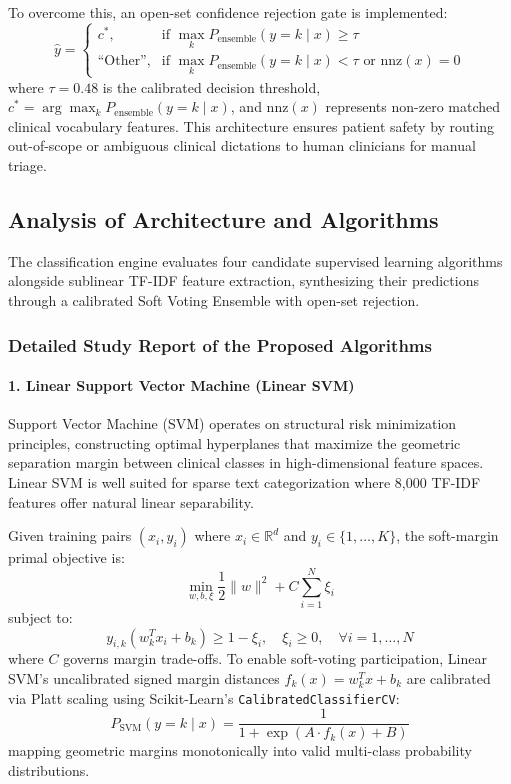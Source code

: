 To overcome this, an open-set confidence rejection gate is implemented:
\begin{equation}
\hat{y} = 
\begin{cases} 
c^*, & \text{if } \max_{k} P_{\text{ensemble}}(y = k \mid x) \ge \tau \\
\text{``Other''}, & \text{if } \max_{k} P_{\text{ensemble}}(y = k \mid x) < \tau \text{ or } \text{nnz}(x) = 0
\end{cases}
\end{equation}
where $\tau = 0.48$ is the calibrated decision threshold, $c^* = \arg\max_k P_{\text{ensemble}}(y = k \mid x)$, and $\text{nnz}(x)$ represents non-zero matched clinical vocabulary features. This architecture ensures patient safety by routing out-of-scope or ambiguous clinical dictations to human clinicians for manual triage.

\subsection{Analysis of Architecture and Algorithms}

The classification engine evaluates four candidate supervised learning algorithms alongside sublinear TF-IDF feature extraction, synthesizing their predictions through a calibrated Soft Voting Ensemble with open-set rejection.

\subsubsection{Detailed Study Report of the Proposed Algorithms}

\paragraph{1. Linear Support Vector Machine (Linear SVM)}
Support Vector Machine (SVM) operates on structural risk minimization principles, constructing optimal hyperplanes that maximize the geometric separation margin between clinical classes in high-dimensional feature spaces. Linear SVM is well suited for sparse text categorization where 8,000 TF-IDF features offer natural linear separability.

Given training pairs $(x_i, y_i)$ where $x_i \in \mathbb{R}^d$ and $y_i \in \{1, \dots, K\}$, the soft-margin primal objective is:
\begin{equation}
\min_{w, b, \xi} \frac{1}{2} \|w\|^2 + C \sum_{i=1}^{N} \xi_i
\end{equation}
subject to:
\begin{equation}
y_{i, k}(w_k^T x_i + b_k) \ge 1 - \xi_i, \quad \xi_i \ge 0, \quad \forall i = 1, \dots, N
\end{equation}
where $C$ governs margin trade-offs. To enable soft-voting participation, Linear SVM's uncalibrated signed margin distances $f_k(x) = w_k^T x + b_k$ are calibrated via Platt scaling using Scikit-Learn's \texttt{Calibrated\allowbreak ClassifierCV}:
\begin{equation}
P_{\text{SVM}}(y = k \mid x) = \frac{1}{1 + \exp(A \cdot f_k(x) + B)}
\end{equation}
mapping geometric margins monotonically into valid multi-class probability distributions.

